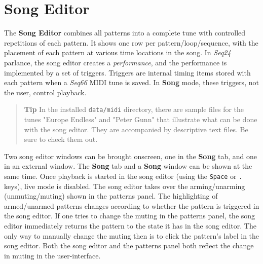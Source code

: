 %
%
%

\section{Song Editor}
\label{sec:song_editor}

   The \textbf{Song Editor} combines all patterns
   into a complete tune with controlled repetitions of each pattern.
   It shows one row per pattern/loop/sequence,
   with the placement of each pattern at various time locations in the song.
   In \textsl{Seq24} parlance, the song editor creates a
   \textsl{performance}, and the performance is implemented by a set of
   triggers.
   Triggers are internal timing items stored with each pattern when a
   \textsl{Seq66} MIDI tune is saved.
   In \textbf{Song} mode, these triggers, not the user, control
   playback.

   \begin{quotation}
      \textbf{Tip}
      In the installed \texttt{data/midi} directory, there are sample files for
      the tunes "Europe Endless" and "Peter Gunn" that illustrate what can be
      done with the song editor.  They are accompanied by descriptive text
      files.  Be sure to check them out.
   \end{quotation}

   Two song editor windows can be
   brought onscreen, one in the \textbf{Song} tab, and
   one in an external window.
   The \textbf{Song} tab and a \textbf{Song} window can be shown at the
   same time.
   Once playback is started in the song editor (using the \texttt{Space} or
   \texttt{.} keys), live mode is disabled.
   The song editor takes over the arming/unarming (unmuting/muting)
   shown in the patterns panel.  The highlighting of armed/unarmed patterns
   changes according to whether the pattern is triggered in the song editor.
   If one tries to change the muting in
   the patterns panel, the song editor immediately returns the pattern to the
   state it has in the song editor.  The only way to manually change the muting
   then is to click the pattern's label in the song editor.
   Both the song editor and the patterns panel both reflect the change in
   muting in the user-interface.

